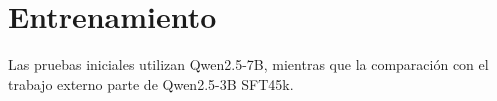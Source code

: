 \section{Entrenamiento}
\label{sec:metodo-entrenamiento}
\label{sec:metodo-evolucion}
Las pruebas iniciales utilizan Qwen2.5-7B, mientras que la comparación con el trabajo externo parte de Qwen2.5-3B SFT45k.



